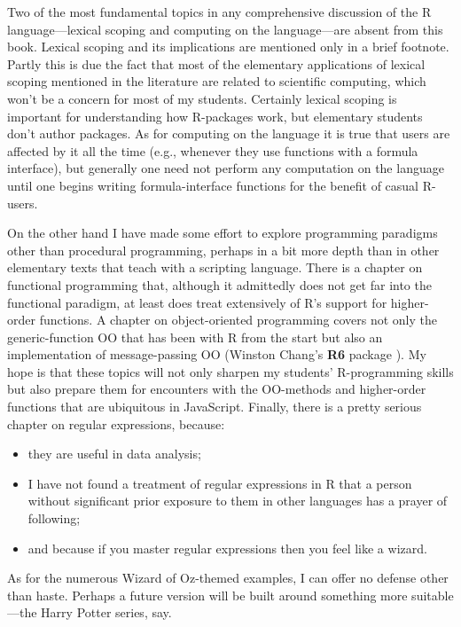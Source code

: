 \documentclass[]{book}
\providecommand{\tightlist}{%
  \setlength{\itemsep}{0pt}\setlength{\parskip}{0pt}}
\theoremstyle{definition}
\theoremstyle{definition}
\theoremstyle{remark}
\begin{document}
Two of the most fundamental topics in any comprehensive discussion of
the R language---lexical scoping and computing on the language---are
absent from this book. Lexical scoping and its implications are
mentioned only in a brief footnote. Partly this is due the fact that
most of the elementary applications of lexical scoping mentioned in the
literature are related to scientific computing, which won't be a concern
for most of my students. Certainly lexical scoping is important for
understanding how R-packages work, but elementary students don't author
packages. As for computing on the language it is true that users are
affected by it all the time (e.g., whenever they use functions with a
formula interface), but generally one need not perform any computation
on the language until one begins writing formula-interface functions for
the benefit of casual R-users.

On the other hand I have made some effort to explore programming
paradigms other than procedural programming, perhaps in a bit more depth
than in other elementary texts that teach with a scripting language.
There is a chapter on functional programming that, although it
admittedly does not get far into the functional paradigm, at least does
treat extensively of R's support for higher-order functions. A chapter
on object-oriented programming covers not only the generic-function OO
that has been with R from the start but also an implementation of
message-passing OO (Winston Chang's \textbf{R6} package \citep{R-R6}).
My hope is that these topics will not only sharpen my students'
R-programming skills but also prepare them for encounters with the
OO-methods and higher-order functions that are ubiquitous in JavaScript.
Finally, there is a pretty serious chapter on regular expressions,
because:

\begin{itemize}
\tightlist
\item
  they are useful in data analysis;
\item
  I have not found a treatment of regular expressions in R that a person
  without significant prior exposure to them in other languages has a
  prayer of following;
\item
  and because if you master regular expressions then you feel like a
  wizard.
\end{itemize}

As for the numerous Wizard of Oz-themed examples, I can offer no defense
other than haste. Perhaps a future version will be built around
something more suitable---the Harry Potter series, say.
\end{document}
